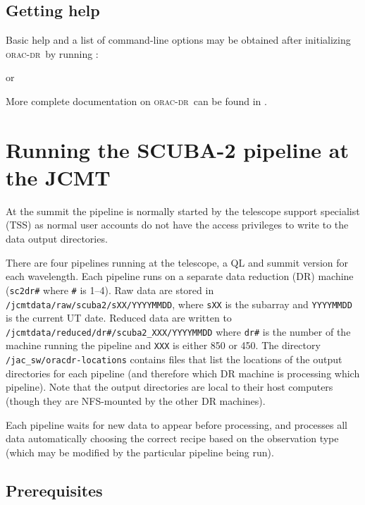 \documentclass[twoside,11pt,nolof]{starlink}
\providecommand{\oracdr}{\textsc{orac-dr}}
\providecommand{\oracsun}{\xref{SUN/230}{sun230}{}}
\begin{document}
\subsection{Getting help}

Basic help and a list of command-line options may be obtained after
initializing \oracdr\ by running :
\begin{terminalv}
\end{terminalv}
or
\begin{terminalv}
\end{terminalv}

More complete documentation on \oracdr\ can be found in \oracsun.

\section{Running the SCUBA-2 pipeline at the JCMT\label{se:runpipe}}

At the summit the pipeline is normally started by the telescope
support specialist (TSS) as normal user accounts do not have the
access privileges to write to the data output directories.

There are four pipelines running at the telescope, a QL and summit
version for each wavelength. Each pipeline runs on a separate data
reduction (DR) machine (\verb+sc2dr#+ where \verb+#+ is 1--4). Raw
data are stored in \verb+/jcmtdata/raw/scuba2/sXX/YYYYMMDD+, where
\verb+sXX+ is the subarray and \verb+YYYYMMDD+ is the current UT
date. Reduced data are written
to\\ \verb+/jcmtdata/reduced/dr#/scuba2_XXX/YYYYMMDD+ where \verb+dr#+
is the number of the machine running the pipeline and \verb+XXX+ is
either 850 or 450. The directory \verb+/jac_sw/oracdr-locations+
contains files that list the locations of the output directories for
each pipeline (and therefore which DR machine is processing which
pipeline). Note that the output directories are local to their host
computers (though they are NFS-mounted by the other DR machines).

Each pipeline waits for new data to appear before processing, and
processes all data automatically choosing the correct recipe based on
the observation type (which may be modified by the particular pipeline
being run).

\subsection{Prerequisites}
\end{document}
